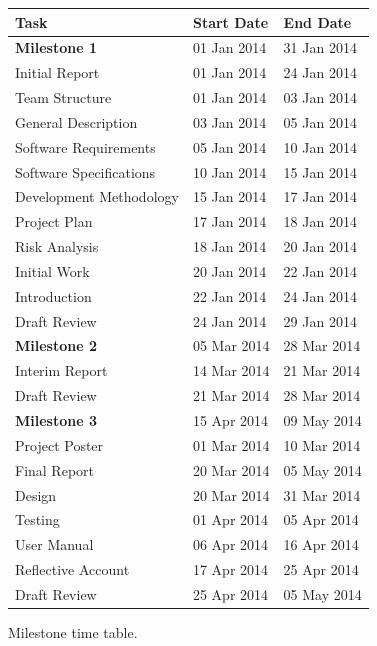 \documentclass[11pt,a4paper]{article}
\renewcommand{\arraystretch}{1.5}
\begin{document}
\renewcommand{\arraystretch}{1.5}
\newcommand*{\tableIndent}{\hspace*{0.4cm}}

\begin{figure}[H]
\centering
\begin{tabular}{|l|l|l|}
\hline \textbf{Task} & \textbf{Start Date} & \textbf{End Date} \\ 
\hline \hline \textbf{Milestone 1} & 01 Jan 2014 & 31 Jan 2014 \\
\hline\tableIndent Initial Report  & 01 Jan 2014 & 24 Jan 2014 \\  
\hline\tableIndent\tableIndent Team Structure  & 01 Jan 2014 & 03 Jan 2014 \\ 
\hline\tableIndent\tableIndent General Description & 03 Jan 2014 & 05 Jan 2014 \\ 
\hline\tableIndent\tableIndent Software Requirements & 05 Jan 2014 & 10 Jan 2014 \\ 
\hline\tableIndent\tableIndent Software Specifications & 10 Jan 2014 & 15 Jan 2014 \\ 
\hline\tableIndent\tableIndent Development Methodology & 15 Jan 2014 & 17 Jan 2014 \\ 
\hline\tableIndent\tableIndent Project Plan  & 17 Jan 2014 & 18 Jan 2014 \\ 
\hline\tableIndent\tableIndent Risk Analysis & 18 Jan 2014 & 20 Jan 2014 \\ 
\hline\tableIndent\tableIndent Initial Work  & 20 Jan 2014 & 22 Jan 2014 \\
\hline\tableIndent\tableIndent Introduction  & 22 Jan 2014 & 24 Jan 2014 \\  
\hline\tableIndent Draft Review  & 24 Jan 2014 & 29 Jan 2014 \\ 
\hline\textbf{Milestone 2} & 05 Mar 2014 & 28 Mar 2014 \\ 
\hline\tableIndent Interim Report & 14 Mar 2014 & 21 Mar 2014 \\ 
\hline\tableIndent Draft Review & 21 Mar 2014 & 28 Mar 2014 \\
\hline\textbf{Milestone 3} & 15 Apr 2014 & 09 May 2014 \\ 
\hline\tableIndent Project Poster & 01 Mar 2014 & 10 Mar 2014 \\ 
\hline\tableIndent Final Report & 20 Mar 2014 & 05 May 2014 \\ 
\hline\tableIndent\tableIndent Design & 20 Mar 2014 & 31 Mar 2014 \\ 
\hline\tableIndent\tableIndent Testing & 01 Apr 2014 & 05 Apr 2014 \\
\hline\tableIndent\tableIndent User Manual & 06 Apr 2014 & 16 Apr 2014 \\
\hline\tableIndent\tableIndent Reflective Account & 17 Apr 2014 & 25 Apr 2014 \\
\hline\tableIndent\tableIndent Draft Review & 25 Apr 2014 & 05 May 2014 \\
\hline 
\end{tabular}
\caption{Milestone time table.\label{fig:milestones-table}}
\end{figure}
\end{document}
